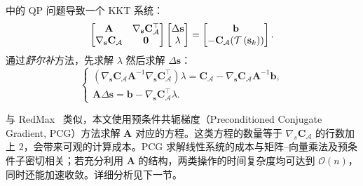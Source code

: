 中的 QP 问题导致一个 KKT 系统：
\begin{equation}
  \begin{bmatrix}
     \mathbf{A}  &  \nabla_{{\mathbf{s}}} \mathbf{C}_{\mathcal{A}}^\top
    \\\nabla_{{\mathbf{s}}} \mathbf{C}_{\mathcal{A}}   & \bold{0}
  \end{bmatrix}
  \begin{bmatrix} \Delta {\mathbf{s}} \\ \lambda \end{bmatrix}
  =\begin{bmatrix}
  \mathbf{b}\\
    - \mathbf{C}_{\mathcal{A}}(\mathcal{T}\left({\mathbf{s}}_k)\right)
  \end{bmatrix}.
  \label{eq: final_kkt}
\end{equation}
通过\textit{舒尔补}方法，先求解 $\lambda$ 然后求解 $\Delta {\mathbf{s}}$：
\begin{equation}
\left\{
\begin{array}{l}
\left( \nabla_{\mathbf{s}}\mathbf{C}_{\mathcal{A}}\mathbf{A}^{-1} \nabla_{\mathbf{s}} \mathbf{C}_{\mathcal{A}}^{\top}\right)  \lambda =\mathbf{C}_{\mathcal{A}} -  \nabla_{\mathbf{s}}\mathbf{C}_{\mathcal{A}}\mathbf{A}^{-1} \mathbf{b},\\
\mathbf{A}\Delta {\mathbf s} =  \mathbf{b} - \nabla_{\mathbf{s}} \mathbf{C}_{\mathcal{A}}^\top \lambda.
\end{array}
\right.
\label{eq: solve_kkt}
\end{equation}

与 RedMax~\cite{wang_redmax_2019} 类似，本文使用预条件共轭梯度（Preconditioned Conjugate Gradient, PCG）方法求解 $\mathbf{A}$ 对应的方程。这类方程的数量等于 $\nabla_s\mathbf{C_{\mathcal A}}$ 的行数加上 $2$，会带来可观的计算成本。PCG 求解线性系统的成本与矩阵--向量乘法及预条件子密切相关；若充分利用 $\mathbf{A}$ 的结构，两类操作的时间复杂度均可达到 $\mathcal{O}(n)$，同时还能加速收敛。详细分析见下一节。

